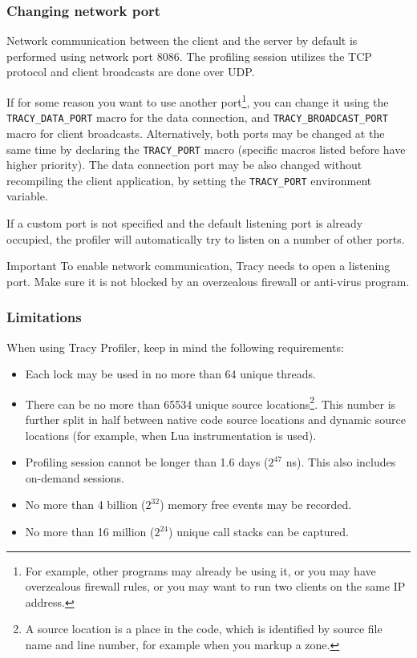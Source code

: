 \documentclass[hidelinks,titlepage,a4paper]{article}
\begin{document}
\subsubsection{Changing network port}

Network communication between the client and the server by default is performed using network port 8086. The profiling session utilizes the TCP protocol and client broadcasts are done over UDP.

If for some reason you want to use another port\footnote{For example, other programs may already be using it, or you may have overzealous firewall rules, or you may want to run two clients on the same IP address.}, you can change it using the \texttt{TRACY\_DATA\_PORT} macro for the data connection, and \texttt{TRACY\_BROADCAST\_PORT} macro for client broadcasts. Alternatively, both ports may be changed at the same time by declaring the \texttt{TRACY\_PORT} macro (specific macros listed before have higher priority). The data connection port may be also changed without recompiling the client application, by setting the \texttt{TRACY\_PORT} environment variable.

If a custom port is not specified and the default listening port is already occupied, the profiler will automatically try to listen on a number of other ports.

\begin{bclogo}[
noborder=true,
couleur=black!5,
logo=\bcbombe
]{Important}
To enable network communication, Tracy needs to open a listening port. Make sure it is not blocked by an overzealous firewall or anti-virus program.
\end{bclogo}

\subsubsection{Limitations}

When using Tracy Profiler, keep in mind the following requirements:

\begin{itemize}
\item Each lock may be used in no more than 64 unique threads.
\item There can be no more than 65534 unique source locations\footnote{A source location is a place in the code, which is identified by source file name and line number, for example when you markup a zone.}. This number is further split in half between native code source locations and dynamic source locations (for example, when Lua instrumentation is used).
\item Profiling session cannot be longer than 1.6 days ($2^{47}$ \si{\nano\second}). This also includes on-demand sessions.
\item No more than 4 billion ($2^{32}$) memory free events may be recorded.
\item No more than 16 million ($2^{24}$) unique call stacks can be captured.
\end{itemize}
\end{document}
